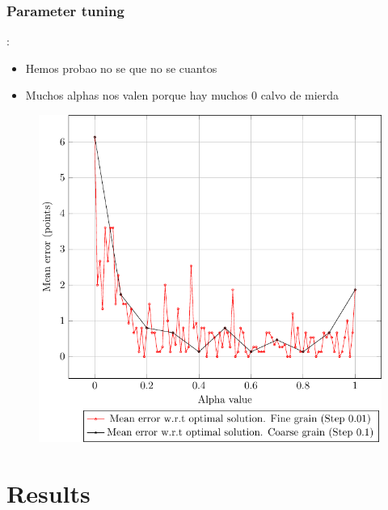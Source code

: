 \documentclass[9pt, aspectratio=169, xcolor=table]{beamer}
\begin{document}
\subsubsection{Parameter tuning}
\begin{frame}{\subsecname: \subsubsecname}

    \begin{minipage}{0.44\textwidth}
	\begin{itemize}
	    \item Hemos probao no se que no se cuantos
	    \item Muchos alphas nos valen porque hay muchos 0 calvo de mierda
	\end{itemize}
    \end{minipage}
    \hfill
    \begin{minipage}{0.52\textwidth}
	\centering
	\begin{figure}[H]
	    \centering
	    \includegraphics[width=\linewidth]{../plots/error.pdf}
	    \label{fig:error}
	\end{figure}
    \end{minipage}
\end{frame}

\section{Results}
\end{document}
